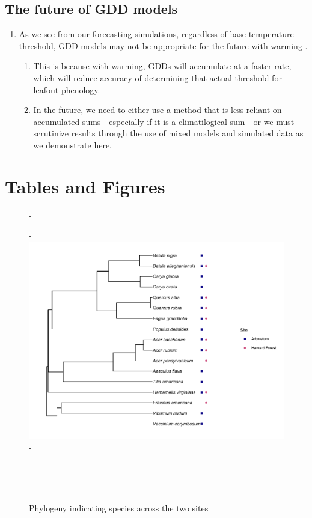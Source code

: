 \documentclass{article}\usepackage[]{graphicx}\usepackage[]{color}
\begin{document}
\subsection*{The future of GDD models}
\begin{enumerate}
\item As we see from our forecasting simulations, regardless of base temperature threshold, GDD models may not be appropriate for the future with warming \citep{Man2010}. 
  \begin{enumerate}
  \item This is because with warming, GDDs will accumulate at a faster rate, which will reduce accuracy of determining that actual threshold for leafout phenology. 
  \item In the future, we need to either use a method that is less reliant on accumulated sums---especially if it is a climatilogical sum---or we must scrutinize results through the use of mixed models and simulated data as we demonstrate here. 
  \end{enumerate}
\end{enumerate}






\section*{Tables and Figures}

{\begin{figure} [H]
  -\begin{center}
  -\includegraphics[width=12cm]{..//phylodata/microtree_hfandts.pdf}
  -\caption{Phylogeny indicating species across the two sites}\label{fig:phylo}
  -\end{center}
  -\end{figure}}
  
\end{document}
